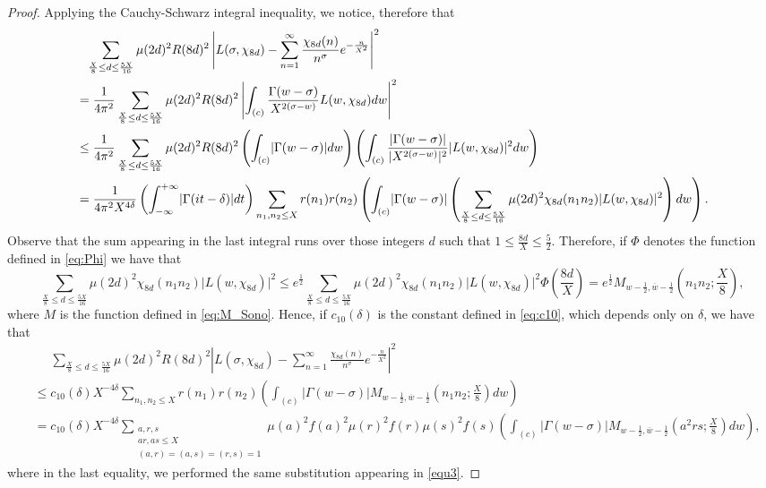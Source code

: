 \documentclass[10pt,a4paper]{amsart}
\theoremstyle{plain}
\theoremstyle{definition}
\theoremstyle{remark}
\begin{document}
\begin{proof}
Applying the Cauchy-Schwarz integral inequality,
we notice, therefore that
\begin{align}
    \notag &\phantom{\leq} \sum_{\frac{X}{8}\leq d\leq \frac{5X}{16}}\mu(2d)^2R(8d)^2\left|L(\sigma,\chi_{8d})-\sum_{n=1}^{\infty}\frac{\chi_{8d}(n)}{n^\sigma} e^{-\frac{n}{X^2}}\right|^2 \\ 
    \notag &= \frac{1}{4\pi^2} \sum_{\frac{X}{8}\leq d\leq \frac{5X}{16}}\mu(2d)^2R(8d)^2\left| \int_{(c)}\frac{\Gamma(w-\sigma)}{X^{2(\sigma-w)}}L(w,\chi_{8d})dw \right|^2 
    \\
    &\leq \frac{1}{4\pi^2} \sum_{\frac{X}{8}\leq d\leq \frac{5X}{16}}\mu(2d)^2R(8d)^2 \left( \int_{(c)} \lvert \Gamma(w-\sigma) \rvert dw \right) \left( \int_{(c)} \frac{\lvert \Gamma(w-\sigma) \rvert}{\lvert X^{2 (\sigma - w)} \rvert^2} \lvert L(w,\chi_{8d}) \rvert^2 dw \right) 
    \\
    \notag &= \frac{1}{4\pi^2 X^{4\delta}} \left( \int_{-\infty}^{+\infty} \lvert \Gamma(it-\delta) \rvert dt \right) \sum_{n_1,n_2 \leq X} r(n_1) r(n_2) \left( \int_{(c)} \lvert \Gamma(w-\sigma) \rvert \left( \sum_{\frac{X}{8} \leq d \leq \frac{5 X}{16}} \mu(2d)^2 \chi_{8d}(n_1 n_2) \lvert L(w,\chi_{8d}) \rvert^2 \right) dw \right). 
\end{align}
Observe that the sum appearing in the last integral runs over those integers $d$ such that $1 \leq \frac{8d}{X} \leq \frac{5}{2}$. Therefore, if $\Phi$ denotes the function defined in \eqref{eq:Phi} we have that
\[
    \sum_{\frac{X}{8} \leq d \leq \frac{5 X}{16}} \mu(2d)^2 \chi_{8d}(n_1 n_2) \lvert L(w,\chi_{8d}) \rvert^2 \leq e^{\frac{1}{2}} \sum_{\frac{X}{8} \leq d \leq \frac{5 X}{16}} \mu(2d)^2 \chi_{8d}(n_1 n_2) \lvert L(w,\chi_{8d}) \rvert^2 \Phi\left( \frac{8d}{X} \right) = e^{\frac{1}{2}} M_{w-\frac{1}{2},\overline{w}-\frac{1}{2}}\left( n_1 n_2; \frac{X}{8} \right),
\]
where $M$ is the function defined in \eqref{eq:M_Sono}.
Hence, if $c_{10}(\delta)$ is the constant defined in \eqref{eq:c10}, which depends only on $\delta$, we have that
\begin{equation} \label{eq:bound_right_L-regularized}
    \begin{aligned}
        &\phantom{\leq} \sum_{\frac{X}{8}\leq d\leq \frac{5X}{16}}\mu(2d)^2R(8d)^2\left|L(\sigma,\chi_{8d})-\sum_{n=1}^{\infty}\frac{\chi_{8d}(n)}{n^\sigma} e^{-\frac{n}{X^2}}\right|^2 \\ 
        &\leq c_{10}(\delta) X^{-4\delta} \sum_{n_1,n_2 \leq X} r(n_1) r(n_2) \left( \int_{(c)} \lvert \Gamma(w-\sigma) \rvert M_{w-\frac{1}{2},\overline{w}-\frac{1}{2}}\left( n_1 n_2;\frac{X}{8} \right) dw \right) \\
        &= c_{10}(\delta) X^{-4\delta} \sum_{\substack{a,r,s\\ar,as\leq X\\(a,r)=(a,s)=(r,s)=1}}
\mu(a)^2f(a)^2\mu(r)^2f(r)\mu(s)^2f(s) \left( \int_{(c)} \lvert \Gamma(w-\sigma) \rvert M_{w-\frac{1}{2},\overline{w}-\frac{1}{2}}\left( a^2 r s;\frac{X}{8} \right) dw \right),
    \end{aligned}
\end{equation}
where in the last equality, we performed the same substitution appearing in \eqref{equ3}.


\end{proof}
\end{document}
